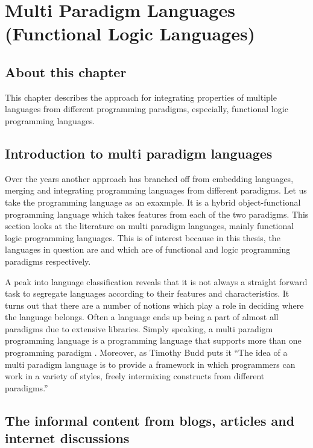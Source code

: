 \documentclass[thesis-solanki.tex]{subfiles}
\begin{document}
\chapter{Multi Paradigm Languages (Functional Logic Languages)}\label{chap:multiparadigm}


\section{About this chapter}

This chapter describes the approach for integrating properties of multiple languages from different programming
paradigms, especially, functional logic programming languages.

\section{Introduction to multi paradigm languages}
Over the years another approach has branched off from embedding languages, merging and integrating programming
languages from different paradigms.
Let us take the  programming language \cite{website:scala} as an exaxmple. It is a hybrid
object-functional programming language which takes features from each of the two paradigms.
This section looks at the literature on multi paradigm languages, mainly functional logic programming
languages. This is of interest because in this thesis, the languages in question are  
and  which are of functional and logic programming paradigms respectively.

A peak into language classification reveals that it is not always a straight forward task to segregate languages
according to their features and characteristics.
It turns out that there are a number of notions which play a role in deciding where the language belongs.
Often a language ends up being a part of almost all paradigms due to extensive libraries.
Simply speaking, a multi paradigm programming language is a programming language that supports more than one
programming paradigm \cite{Krishnamurthi:2008:TPL:1480828.1480846}. Moreover, as Timothy Budd puts it
\cite{website:wikimultiparadigm} ``The idea of a multi paradigm language is to provide a framework in which
programmers can work in a variety of styles, freely intermixing constructs from different paradigms.''


\section{The informal content from blogs, articles and internet discussions}
  
\end{document}
